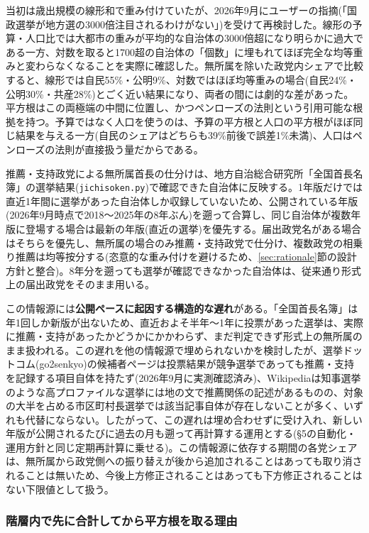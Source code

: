 \documentclass[a4paper,11pt]{ltjsarticle}
\begin{document}
当初は歳出規模の線形和で重み付けていたが、2026年9月にユーザーの指摘(「国政選挙が地方選の3000倍注目されるわけがない」)を受けて再検討した。線形の予算・人口比では大都市の重みが平均的な自治体の3000倍超になり明らかに過大である一方、対数を取ると1700超の自治体の「個数」に埋もれてほぼ完全な均等重みと変わらなくなることを実際に確認した。無所属を除いた政党内シェアで比較すると、線形では自民55\%・公明9\%、対数ではほぼ均等重みの場合(自民24\%・公明30\%・共産28\%)とごく近い結果になり、両者の間には劇的な差があった。平方根はこの両極端の中間に位置し、かつペンローズの法則という引用可能な根拠を持つ。予算ではなく人口を使うのは、予算の平方根と人口の平方根がほぼ同じ結果を与える一方(自民のシェアはどちらも39\%前後で誤差1\%未満)、人口はペンローズの法則が直接扱う量だからである。

推薦・支持政党による無所属首長の仕分けは、地方自治総合研究所「全国首長名簿」の選挙結果(\texttt{jichisoken.py})で確認できた自治体に反映する。1年版だけでは直近1年間に選挙があった自治体しか収録していないため、公開されている年版(2026年9月時点で2018〜2025年の8年ぶん)を遡って合算し、同じ自治体が複数年版に登場する場合は最新の年版(直近の選挙)を優先する。届出政党名がある場合はそちらを優先し、無所属の場合のみ推薦・支持政党で仕分け、複数政党の相乗り推薦は均等按分する(恣意的な重み付けを避けるため、\ref{sec:rationale}節の設計方針と整合)。8年分を遡っても選挙が確認できなかった自治体は、従来通り形式上の届出政党をそのまま用いる。

この情報源には\textbf{公開ペースに起因する構造的な遅れ}がある。「全国首長名簿」は年1回しか新版が出ないため、直近およそ半年〜1年に投票があった選挙は、実際に推薦・支持があったかどうかにかかわらず、まだ判定できず形式上の無所属のまま扱われる。この遅れを他の情報源で埋められないかを検討したが、選挙ドットコム(go2senkyo)の候補者ページは投票結果が競争選挙であっても推薦・支持を記録する項目自体を持たず(2026年9月に実測確認済み)、Wikipediaは知事選挙のような高プロファイルな選挙には地の文で推薦関係の記述があるものの、対象の大半を占める市区町村長選挙では該当記事自体が存在しないことが多く、いずれも代替にならない。したがって、この遅れは埋め合わせずに受け入れ、新しい年版が公開されるたびに過去の月も遡って再計算する運用とする(\S5の自動化・運用方針と同じ定期再計算に乗せる)。この情報源に依存する期間の各党シェアは、無所属から政党側への振り替えが後から追加されることはあっても取り消されることは無いため、今後上方修正されることはあっても下方修正されることはない下限値として扱う。

\subsubsection{階層内で先に合計してから平方根を取る理由}
\label{sec:level-aggregation}
\end{document}
